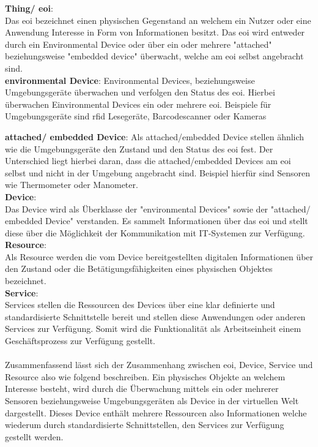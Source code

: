 \documentclass[a4paper, 12pt, twoside, headsepline=true]{scrartcl} %
\begin{document}
\textbf{Thing/ \ac{eoi}}: \\ 
Das \ac{eoi} bezeichnet einen physischen Gegenstand an welchem ein Nutzer oder eine Anwendung Interesse in Form von Informationen besitzt. Das \ac{eoi} wird entweder durch ein Environmental Device oder über ein oder mehrere "attached" beziehungsweise "embedded device" überwacht, welche am \ac{eoi} selbst angebracht sind.
\\

\textbf{environmental Device}: 
Environmental Devices, beziehungsweise Umgebungsgeräte überwachen und verfolgen den Status des \ac{eoi}. Hierbei überwachen Einvironmental Devices ein oder mehrere \ac{eoi}. Beispiele für Umgebungsgeräte sind \ac{rfid} Lesegeräte, Barcodescanner oder Kameras

\textbf{attached/ embedded Device}: 
Als attached/embedded Device stellen ähnlich wie die Umgebungsgeräte den Zustand und den Status des \ac{eoi} fest. Der Unterschied liegt hierbei daran, dass die attached/embedded Devices am \ac{eoi} selbst und nicht in der Umgebung angebracht sind. Beispiel hierfür sind Sensoren wie Thermometer oder Manometer.
\\

\textbf{Device}: \\
Das Device wird als Überklasse der "environmental Devices" sowie der "attached/ embedded Device" verstanden. Es sammelt Informationen über das \ac{eoi} und stellt diese über die Möglichkeit der Kommunikation mit IT-Systemen zur Verfügung.
\\

\textbf{Resource}: \\
Als Resource werden die vom Device bereitgestellten digitalen Informationen über den Zustand oder die Betätigungsfähigkeiten eines physischen Objektes bezeichnet.
\\

\textbf{Service}: \\
Services stellen die Ressourcen des Devices über eine klar definierte und standardisierte Schnittstelle bereit und stellen diese Anwendungen oder anderen Services zur Verfügung. Somit wird die Funktionalität als Arbeitseinheit einem Geschäftsprozess zur Verfügung gestellt.
\\
\\
Zusammenfassend lässt sich der Zusammenhang zwischen \ac{eoi}, Device, Service und Resource also wie folgend beschreiben. Ein physisches Objekte an welchem Interesse besteht, wird durch die Überwachung mittels ein oder mehrerer Sensoren beziehungsweise Umgebungsgeräten als Device in der virtuellen Welt dargestellt. Dieses Device enthält mehrere Ressourcen also Informationen welche wiederum durch standardisierte Schnittstellen, den Services zur Verfügung gestellt werden.
\end{document}

